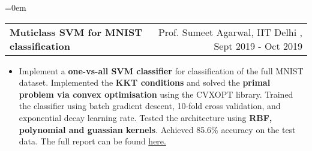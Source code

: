 \documentclass{article}
\makeatletter
\newenvironment{longversion}{}{} %
\newcommand{\headerrow}[2]
{\begin{tabular*}{\linewidth}{l@{\extracolsep{\fill}}r}
	#1 &
	#2 \\
\end{tabular*}}
\makeatother
\begin{document}
\begin{longversion}
\begin{list} {}{\leftmargin=0em}
 \item[]
\headerrow { \textbf{Muticlass SVM for MNIST classification}} {Prof. Sumeet Agarwal, IIT Delhi , Sept 2019 - Oct 2019}
 \begin{itemize} \item[]
Implement a \textbf{one-vs-all SVM classifier} for classification of the full MNIST dataset. Implemented the \textbf{KKT conditions} and solved the \textbf{primal problem via convex optimisation} using the CVXOPT library. Trained the classifier using batch gradient descent, 10-fold cross validation, and exponential decay learning rate. Tested the architecture using \textbf{RBF, polynomial and guassian kernels}. Achieved 85.6\% accuracy on the test data. The full report can be found \href{https://csciitd-my.sharepoint.com/:b:/g/personal/ee1170938_iitd_ac_in/EY6gCxDGVMpGpwB8hGwlorYB93PorICEWlWbLB1OlU2WGQ?e=ocqnLY}{here.}

 \end{itemize}
 
 
 

\end{list}
\end{longversion}
\end{document}
